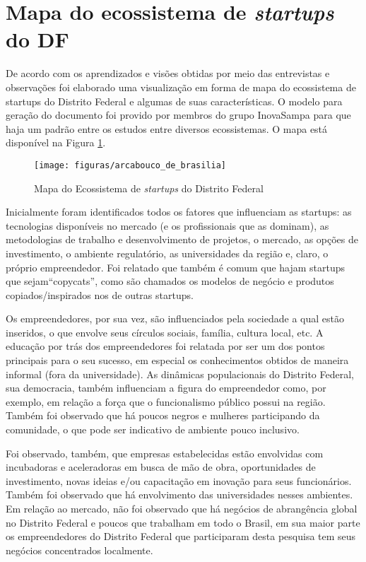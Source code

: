 \section{Mapa do ecossistema de \textit{startups} do DF}
\label{mapa_do_ecossistema_do_distrito_federal}

De acordo com os aprendizados e visões obtidas por meio das entrevistas e observações foi elaborado uma visualização em forma de mapa do ecossistema de startups do Distrito Federal e algumas de suas características. O modelo para geração do documento foi provido por membros do grupo InovaSampa para que haja um padrão entre os estudos entre diversos ecossistemas. O mapa está disponível na Figura \ref{figure:mapa_do_ecossistema}.

\begin{figure}[!htb]
	\centering
	\texttt{[image: figuras/arcabouco\_de\_brasilia]}
	\caption{Mapa do Ecossistema de \textit{startups} do Distrito Federal}
	\label{figure:mapa_do_ecossistema}
\end{figure} 

Inicialmente foram identificados todos os fatores que influenciam as startups: as tecnologias disponíveis no mercado (e os profissionais que as dominam), as metodologias de trabalho e desenvolvimento de projetos, o mercado, as opções de investimento, o ambiente regulatório, as universidades da região e, claro, o próprio empreendedor. Foi relatado que também é comum que hajam startups que sejam``copycats'', como são chamados os modelos de negócio e produtos copiados/inspirados nos de outras startups.

Os empreendedores, por sua vez, são influenciados pela sociedade a qual estão inseridos, o que envolve seus círculos sociais, família, cultura local, etc. A educação por trás dos empreendedores foi relatada por ser um dos pontos principais para o seu sucesso, em especial os conhecimentos obtidos de maneira informal (fora da universidade). As dinâmicas populacionais do Distrito Federal, sua democracia, também influenciam a figura do empreendedor como, por exemplo, em relação a força que o funcionalismo público possui na região. Também foi observado que há poucos negros e mulheres participando da comunidade, o que pode ser indicativo de ambiente pouco inclusivo. 

Foi observado, também, que empresas estabelecidas estão envolvidas com incubadoras e aceleradoras em busca de mão de obra, oportunidades de investimento, novas ideias e/ou capacitação em inovação para seus funcionários. Também foi observado que há envolvimento das universidades nesses ambientes. Em relação ao mercado, não foi observado que há negócios de abrangência global no Distrito Federal e poucos que trabalham em todo o Brasil, em sua maior parte os empreendedores do Distrito Federal que participaram desta pesquisa tem seus negócios concentrados localmente.

